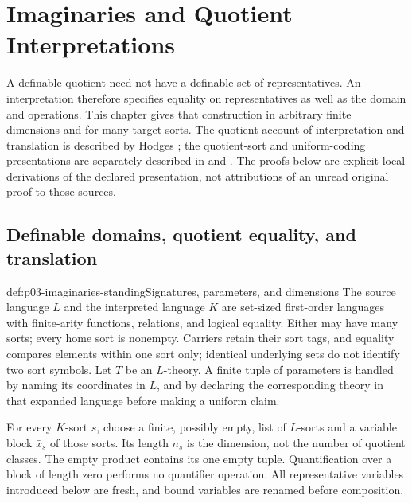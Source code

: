 \section{Imaginaries and Quotient Interpretations}
\label{sec:p03-imaginaries-quotient-interpretations}

A definable quotient need not have a definable set of representatives.
An interpretation therefore specifies equality on representatives as well
as the domain and operations. This chapter gives that construction in arbitrary
finite dimensions and for many target sorts. The quotient account of
interpretation and translation is described by Hodges
\cite[\S2, paragraphs on interpretation]{Hodges2020ModelTheorySEP};
the quotient-sort and uniform-coding presentations are separately described in
\cite[Lecture 15, pp.~1--4]{Speirs2013Imaginaries} and
\cite[slides~6--8]{Baldwin2023Imaginaries}. The proofs below are explicit local
derivations of the declared presentation, not attributions of an unread
original proof to those sources.

\subsection{Definable domains, quotient equality, and translation}

\begin{hbconvention}{def:p03-imaginaries-standing}{Signatures, parameters, and dimensions}
The source language \(L\) and the interpreted language \(K\) are set-sized
first-order languages with finite-arity functions, relations, and logical
equality. Either may have many sorts; every home sort is nonempty.
Carriers retain their sort tags, and equality compares elements within one
sort only; identical underlying sets do not identify two sort symbols.
Let \(T\) be an \(L\)-theory. A finite tuple of parameters is handled by
naming its coordinates in \(L\), and by declaring the corresponding theory
in that expanded language before making a uniform claim.

For every \(K\)-sort \(s\), choose a finite, possibly empty, list of
\(L\)-sorts and a variable block \(\bar x_s\) of those sorts. Its length
\(n_s\) is the dimension, not the number of quotient classes. The empty
product contains its one empty tuple. Quantification over a block of length
zero performs no quantifier operation. All representative variables introduced
below are fresh, and bound variables are renamed before composition.
\end{hbconvention}

